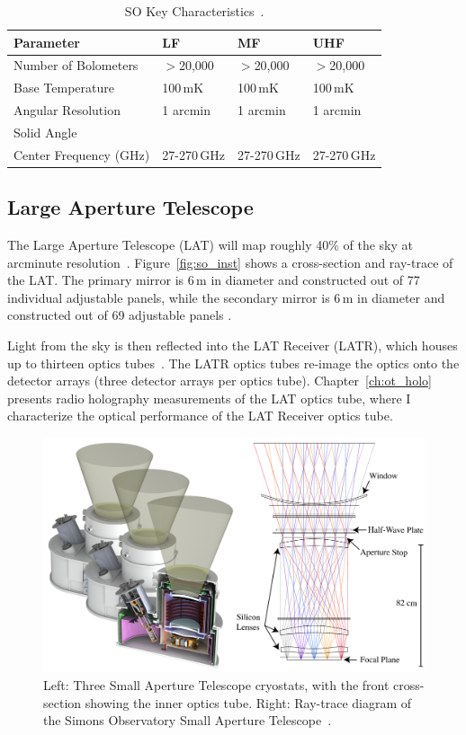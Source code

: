\begin{table}[b]
    \centering
    \begin{tabular}{|l|l|l|l|} \hline
        \textbf{ Parameter} &  \textbf{LF} &  \textbf{MF}  &  \textbf{UHF}  \\ \hline \hline
        Number of Bolometers & $>$20,000& $>$20,000& $>$20,000\\\hline
        Base Temperature & 100\,mK & 100\,mK & 100\,mK\\\hline
        Angular Resolution & 1 arcmin &1 arcmin &1 arcmin\\\hline
        Solid Angle & & &\\\hline
        Center Frequency (GHz) & 27-270\,GHz & 27-270\,GHz & 27-270\,GHz\\\hline
    \end{tabular} \caption{SO Key Characteristics~\cite{Gudmundsson:21}.}
    \label{tab:so}
\end{table}

\subsection{Large Aperture Telescope}

The Large Aperture Telescope (LAT) will map roughly 40\% of the sky at arcminute resolution~\cite{xu/etal:2020c}.   Figure~\ref{fig:so_inst} shows a cross-section and ray-trace of the LAT.  The primary mirror is 6\,m in diameter and constructed out of 77 individual adjustable panels, while the secondary mirror is 6\,m in diameter and constructed out of 69 adjustable panels \cite{gali18}.

Light from the sky is then reflected into the LAT Receiver (LATR), which houses up to thirteen optics tubes~\cite{Xu_2021}.  The LATR optics tubes re-image the optics onto the detector arrays (three detector arrays per optics tube).  Chapter~\ref{ch:ot_holo} presents radio holography measurements of the LAT optics tube, where I characterize the optical performance of the LAT Receiver optics tube.

\begin{figure}[ht]
    \centering
    \includegraphics[width = \textwidth]{Figures/SAT3.pdf}
    \caption{Left: Three Small Aperture Telescope cryostats, with the front cross-section showing the inner optics tube.  Right: Ray-trace diagram of the Simons Observatory Small Aperture Telescope~\cite{2020SPIE11445E7LK}.}
    \label{fig:sat3s}
\end{figure}


